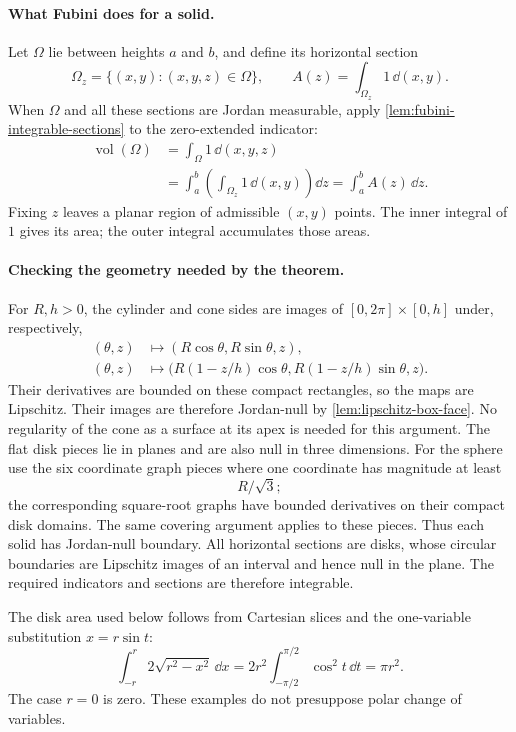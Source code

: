 \paragraph{What Fubini does for a solid.}
Let $\Omega$ lie between heights $a$ and $b$, and define its horizontal section
\[
\Omega_z=\{(x,y):(x,y,z)\in\Omega\},\qquad
A(z)=\int_{\Omega_z}1\,\dd(x,y).
\]
When $\Omega$ and all these sections are Jordan measurable, apply
\cref{lem:fubini-integrable-sections} to the zero-extended indicator:
\begin{align*}
\operatorname{vol}(\Omega)
&=\int_\Omega1\,\dd(x,y,z)\\
&=\int_a^b\left(\int_{\Omega_z}1\,\dd(x,y)\right)\dd z
=\int_a^b A(z)\,\dd z.
\end{align*}
Fixing $z$ leaves a planar region of admissible $(x,y)$ points. The inner
integral of $1$ gives its area; the outer integral accumulates those areas.

\paragraph{Checking the geometry needed by the theorem.}
For $R,h>0$, the cylinder and cone sides are images of $[0,2\pi]\times[0,h]$
under, respectively,
\begin{align*}
(\theta,z)&\longmapsto(R\cos\theta,R\sin\theta,z),\\
(\theta,z)&\longmapsto
\bigl(R(1-z/h)\cos\theta,R(1-z/h)\sin\theta,z\bigr).
\end{align*}
Their derivatives are bounded on these compact rectangles, so the maps
are Lipschitz. Their images are therefore Jordan-null by
\cref{lem:lipschitz-box-face}.
No regularity of the cone as a surface at its apex is needed for this argument.
The flat disk pieces lie in planes and are also null in three dimensions.
For the sphere use the six coordinate graph pieces where one coordinate
has magnitude at least
\[
R/\sqrt3;
\]
 the corresponding square-root graphs
have bounded derivatives on their compact disk domains. The same covering
argument applies to these pieces. Thus each solid has Jordan-null boundary.
All horizontal sections are disks, whose circular boundaries are Lipschitz
images of an interval and hence null in the plane. The required indicators
and sections are therefore integrable.

The disk area used below follows from Cartesian slices and the one-variable
substitution $x=r\sin t$:
\[
\int_{-r}^r2\sqrt{r^2-x^2}\,\dd x
=2r^2\int_{-\pi/2}^{\pi/2}\cos^2t\,\dd t=\pi r^2.
\]
The case $r=0$ is zero. These examples do not presuppose polar change of variables.

